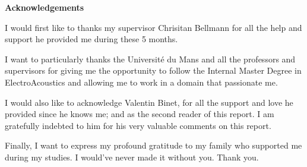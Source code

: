 \documentclass{report}
\newif\ifdraft
\begin{document}




\ifdraft
\listoftodos
\else
\thispagestyle{empty}
\begin{center}
{\Large\textbf{Acknowledgements}} 
\end{center}
\vspace{1cm}
I would first like to thanks my supervisor Chrisitan Bellmann for all the help and support he provided me during these 5 months. 

\vspace{0.5cm}

I want to particularly thanks the Université du Mans and all the professors and supervisors for giving me the opportunity to follow the Internal Master Degree in ElectroAcoustics and allowing me to work in a domain that passionate me. 

\vspace{0.5cm}

I would also like to acknowledge Valentin Binet, for all the support and love he provided since he knows me; and as the second reader of this report. I am gratefully indebted to him for his very valuable comments on this report.

\vspace{0.5cm}

Finally, I want to express my profound gratitude to my family who supported me during my studies. I would've never made it without you. Thank you.

\vfill %
\fi	%

\clearpage
\renewcommand\contentsname{Table of contents}
\tableofcontents
{} %

\clearpage
\listoffigures
{}
\end{document}
